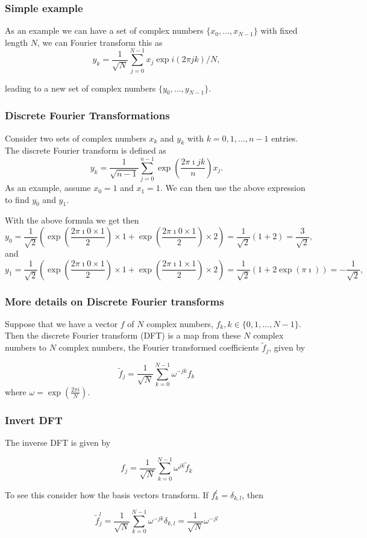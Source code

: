 \documentclass{beamer}
\begin{document}
\begin{frame}
\frametitle{Simple example}

As an example we can have a set of complex numbers
$\{x_0,\dots,x_{N-1}\}$ with fixed length $N$, we can Fourier
transform this as
\[
y_k = \frac{1}{\sqrt{N}} \sum_{j=0}^{N-1} x_j \exp{i(2\pi jk)/N},
\]

leading to a new set of complex numbers $\{ y_0,\dots,y_{N-1}\}$.
\end{frame}

\begin{frame}
\frametitle{Discrete Fourier Transformations}

Consider two sets of complex numbers $x_k$ and $y_k$ with
$k=0,1,\dots,n-1$ entries. The discrete Fourier transform is defined
as
\[
y_k = \frac{1}{\sqrt{n-1}} \sum_{j=0}^{n-1} \exp{(\frac{2\pi\imath jk}{n})} x_j.
\]
As an example, assume $x_0=1$ and $x_1=1$. We can then use the above expression to find $y_0$ and $y_1$.

With the above formula we get then
\[
y_0 = \frac{1}{\sqrt{2}} \left( \exp{(\frac{2\pi\imath 0\times 1}{2})} \times 1+\exp{(\frac{2\pi\imath 0\times 1}{2})}\times 2\right)=\frac{1}{\sqrt{2}}(1+2)=\frac{3}{\sqrt{2}},
\]
and
\[
y_1 = \frac{1}{\sqrt{2}} \left( \exp{(\frac{2\pi\imath 0\times 1}{2})} \times 1+\exp{(\frac{2\pi\imath 1\times 1}{2})}\times 2\right)=\frac{1}{\sqrt{2}}(1+2\exp{(\pi\imath)})=-\frac{1}{\sqrt{2}},
\]
\end{frame}

\begin{frame}
\frametitle{More details on Discrete Fourier transforms}

Suppose that we have a vector $f$ of $N$ complex numbers, $f_{k}, k
\in\{0,1, \ldots, N-1\}$. Then the discrete Fourier transform (DFT) is
a map from these $N$ complex numbers to $N$ complex numbers, the
Fourier transformed coefficients $\tilde{f}_{j}$, given by

\begin{equation*}
\tilde{f}_{j}=\frac{1}{\sqrt{N}} \sum_{k=0}^{N-1} \omega^{-j k} f_{k}
\end{equation*}
where $\omega=\exp \left(\frac{2 \pi i}{N}\right)$.
\end{frame}

\begin{frame}
\frametitle{Invert DFT}

The inverse DFT is given by

\begin{equation*}
f_{j}=\frac{1}{\sqrt{N}} \sum_{k=0}^{N-1} \omega^{j k} \tilde{f}_{k}
\end{equation*}

To see this consider how the basis vectors transform. If $f_{k}^{l}=\delta_{k, l}$, then

\begin{equation*}
\tilde{f}_{j}^{l}=\frac{1}{\sqrt{N}} \sum_{k=0}^{N-1} \omega^{-j k} \delta_{k, l}=\frac{1}{\sqrt{N}} \omega^{-j l}
\end{equation*}
\end{frame}
\end{document}
